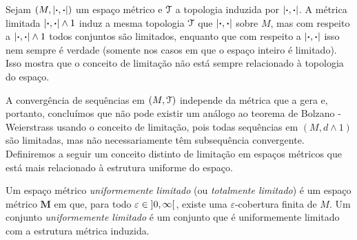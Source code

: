 Sejam $(M,\left\vert{\bm{\cdot}},{\bm{\cdot}}\right\vert)$ um espaço métrico e $\mathcal{T}$ a topologia induzida por $\left\vert{\bm{\cdot}},{\bm{\cdot}}\right\vert$. A métrica limitada $\left\vert{\bm{\cdot}},{\bm{\cdot}}\right\vert \mathbin{\wedge} 1$ induz a mesma topologia $\mathcal{T}$ que $\left\vert{\bm{\cdot}},{\bm{\cdot}}\right\vert$ sobre $M$, mas com respeito a $\left\vert{\bm{\cdot}},{\bm{\cdot}}\right\vert \mathbin{\wedge} 1$ todos conjuntos são limitados, enquanto que com respeito a $\left\vert{\bm{\cdot}},{\bm{\cdot}}\right\vert$ isso nem sempre é verdade (somente nos casos em que o espaço inteiro é limitado). Isso mostra que o conceito de limitação não está sempre relacionado à topologia do espaço.

A convergência de sequências em $(M,\mathcal{T})$ independe da métrica que a gera e, portanto, concluímos que não pode existir um análogo ao teorema de Bolzano - Weierstrass usando o conceito de limitação, pois todas sequências em $(M,d \wedge 1)$ são limitadas, mas não necessariamente têm subsequência convergente. Definiremos a seguir um conceito distinto de limitação em espaços métricos que está mais relacionado à estrutura uniforme do espaço.

\begin{definition}
Um espaço métrico \emph{uniformemente limitado} (ou \emph{totalmente limitado}) é um espaço métrico $\bm M$ em que, para todo $\varepsilon \in \left]0,\allowbreak \infty\right[$, existe uma $\varepsilon$-cobertura finita de $M$. Um conjunto \emph{uniformemente limitado} é um conjunto que é uniformemente limitado com a estrutura métrica induzida.
\end{definition}

